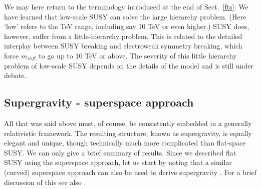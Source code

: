 \documentclass[12pt]{article}
\numberwithin{equation}{section}
\begin{document}
We may here return to the terminology introduced at the end of Sect.~\ref{fts}: We have learned that low-scale SUSY can solve the large hierarchy problem. (Here `low' refers to the TeV range, including say 10 TeV or even higher.) SUSY does, however, suffer from a little-hierarchy problem. This is related to the detailed interplay between SUSY breaking and electroweak symmetry breaking, which force $m_{soft}$ to go up to 10 TeV or above. The severity of this little hierarchy problem of low-scale SUSY depends on the details of the model and is still under debate.



\subsection{Supergravity - superspace approach}

All that was said above must, of course, be consistently embedded in a generally relativistic framework. The resulting structure, known as supergravity, is equally elegant and unique, though technically much more complicated than flat-space SUSY. We can only give a brief summary of results. Since we described flat SUSY using the superspace approach, let us start by noting that a similar (curved) superspace approach can also be used to derive supergravity \cite{Wess:1992cp, bk}. For a brief discussion of this see also \cite{Quevedo:2010ui}.
\end{document}
